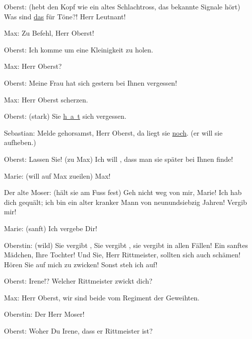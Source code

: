 \pstart
           Oberst: (hebt den Kopf wie ein altes Schlachtross, das bekannte Signale hört) Was
               sind \uline{das} für Töne?! Herr Leutnant!\pend
           
\pstart
           Max: Zu Befehl, Herr Oberst!\pend
           
\pstart
           Oberst: Ich komme um eine Kleinigkeit zu holen.\pend
           
\pstart
           Max: Herr Oberst?\pend
           
\pstart
           {\pb}Oberst: Meine Frau hat sich
               gestern bei Ihnen vergessen!\pend
           
\pstart
           Max: Herr Oberst scherzen.\pend
           
\pstart
           Oberst: (stark) Sie 
               \uline{h a t}
                sich vergessen.\pend
           
\pstart
           Sebastian: Melde gehorsamst, Herr Oberst, da liegt sie \uline{noch}. (er will sie aufheben.)\pend
           
\pstart
           Oberst: Lassen Sie! (zu Max) Ich will , dass man
               sie später bei Ihnen finde!\pend
           
\pstart
           Marie: (will auf Max zueilen) Max!\pend
           
\pstart
           Der alte Moser: (hält sie am Fuss fest) Geh nicht weg von mir, Marie! Ich hab dich
               gequält; ich bin ein alter kranker Mann von neunundsiebzig Jahren! Vergib mir!\pend
           
\pstart
           Marie: (sanft) Ich vergebe Dir!\pend
           
\pstart
           Oberstin: (wild) Sie vergibt , Sie vergibt , sie vergibt in allen Fällen! Ein sanftes Mädchen, Ihre
               Tochter! Und Sie, Herr Rittmeister, sollten sich auch schämen! Hören Sie auf mich zu
               zwicken! Sonst steh ich auf!\pend
           
\pstart
           Oberst: Irene!? Welcher Rittmeister zwickt dich?\pend
           
\pstart
           Max: Herr Oberst, wir sind beide vom Regiment der Geweihten.\pend
           
\pstart
           Oberstin: Der Herr Moser!\pend
           
\pstart
           Oberst: Woher \label{T_L01900-2v}\label{T_L01900-2} Du Irene, dass er Rittmeister ist?\pend
           
